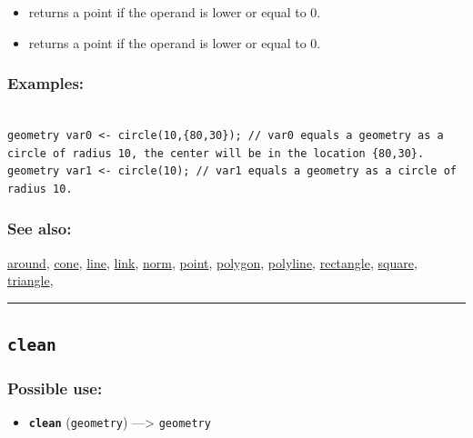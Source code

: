 \documentclass[]{book}
\providecommand{\tightlist}{%
  \setlength{\itemsep}{0pt}\setlength{\parskip}{0pt}}
\theoremstyle{definition}
\theoremstyle{definition}
\theoremstyle{definition}
\theoremstyle{remark}
\begin{document}
\begin{itemize}
\tightlist
\item
  returns a point if the operand is lower or equal to 0.\\
\item
  returns a point if the operand is lower or equal to 0.
\end{itemize}

\subsubsection{Examples:}\label{examples-64}

\begin{verbatim}
 
geometry var0 <- circle(10,{80,30}); // var0 equals a geometry as a circle of radius 10, the center will be in the location {80,30}. 
geometry var1 <- circle(10); // var1 equals a geometry as a circle of radius 10.
\end{verbatim}

\subsubsection{See also:}\label{see-also-52}

\href{operators-a-to-a.html\#around}{around},
\href{operators-b-to-c.html\#cone}{cone},
\href{operators-i-to-m.html\#line}{line},
\href{operators-i-to-m.html\#link}{link},
\href{operators-n-to-r.html\#norm}{norm},
\href{operators-n-to-r.html\#point}{point},
\href{operators-n-to-r.html\#polygon}{polygon},
\href{operators-n-to-r.html\#polyline}{polyline},
\href{operators-n-to-r.html\#rectangle}{rectangle},
\href{operators-s-to-z.html\#square}{square},
\href{operators-s-to-z.html\#triangle}{triangle},

\begin{center}\rule{0.5\linewidth}{\linethickness}\end{center}

\subsection{\texorpdfstring{\texttt{clean}}{clean}}\label{clean}

\subsubsection{Possible use:}\label{possible-use-86}

\begin{itemize}
\tightlist
\item
  \textbf{\texttt{clean}} (\texttt{geometry}) ---\textgreater{}
  \texttt{geometry}
\end{itemize}
\end{document}
